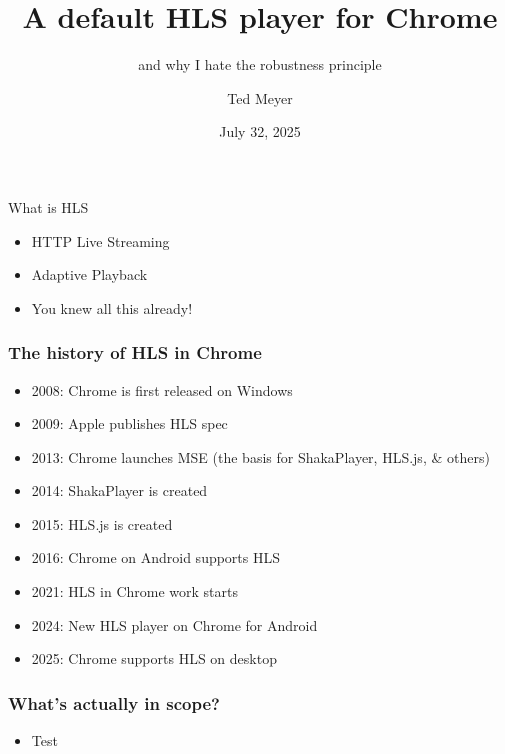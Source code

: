 \documentclass{beamer}
\title{A default HLS player for Chrome}
\subtitle{and why I hate the robustness principle}
\date{July 32, 2025}
\author{Ted Meyer}
\institute{Google}
\begin{document}
\maketitle

\begin{frame}{What is HLS}
  \begin{itemize}[<+->]
    \item<1-3> HTTP Live Streaming
    \item<2-3> Adaptive Playback
    \item<3-3> You knew all this already!
  \end{itemize}
\end{frame}


\begin{frame}[t]
  \frametitle{The history of HLS in Chrome}

  \begin{itemize}[<+->]
    \item<1> 2008: Chrome is first released on Windows
    \item<2> 2009: Apple publishes HLS spec
    \item<3> 2013: Chrome launches MSE (the basis for ShakaPlayer, HLS.js, \& others)
    \item<4> 2014: ShakaPlayer is created %
    \item<5> 2015: HLS.js is created %
    \item<6> 2016: Chrome on Android supports HLS
    \item<7> 2021: HLS in Chrome work starts
    \item<8> 2024: New HLS player on Chrome for Android
    \item<9> 2025: Chrome supports HLS on desktop
  \end{itemize}
\end{frame}

\iffalse
\begin{frame}
  \frametitle{What's actually in scope?}
  \begin{itemize}[<+->]
    \item<1> Test
  \end{itemize}
\end{frame}
\end{document}
